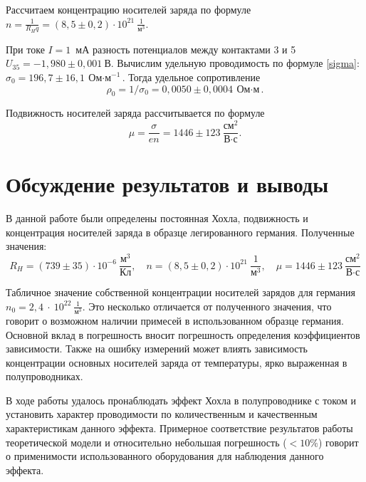 \documentclass[a4paper,12pt]{article} %
\begin{document}
Рассчитаем концентрацию носителей заряда по формуле $n = \frac{1}{R_H q} = (8,5\pm0,2) \cdot 10^{21}~\frac{1}{\text{м}^3}$.

При токе $I = 1$~мА разность потенциалов между контактами 3 и 5 \newline $U_{35} = -1,980\pm0,001~\text{В}$. Вычислим удельную проводимость по формуле \eqref{sigma}: \newline $\sigma_0 = 196,7\pm16,1~{\text{Ом} \cdot \text{м}}^{-1}$. Тогда удельное сопротивление $$\rho_0 = 1/\sigma_0 = 0,0050\pm0,0004~{\text{Ом} \cdot \text{м}}.$$

Подвижность носителей заряда рассчитывается по формуле $$\mu = \frac{\sigma}{e n} = 1446\pm123~\frac{\text{см}^2}{\text{В} \cdot \text{с}}.$$

\section{Обсуждение результатов и выводы}

В данной работе были определены постоянная Хохла, подвижность и концентрация носителей заряда в образце легированного германия. Полученные значения:
$$\boxed{R_H = (739\pm35) \cdot 10^{-6}~\frac{\text{м}^3}{\text{Кл}}, \quad n = (8,5\pm0,2) \cdot 10^{21}~\frac{1}{\text{м}^3}, \quad \mu = 1446\pm123~\frac{\text{см}^2}{\text{В} \cdot \text{с}}}$$

Табличное значение собственной концентрации носителей зарядов для германия $n_0 = 2,4~\cdot~10^{22}~\frac{1}{\text{м}^3}$. Это несколько отличается от полученного значения, что говорит о возможном наличии примесей в использованном образце германия. Основной вклад в погрешность вносит погрешность определения коэффициентов зависимости. Также на ошибку измерений может влиять зависимость концентрации основных носителей заряда от температуры, ярко выраженная в полупроводниках.

В ходе работы удалось пронаблюдать эффект Хохла в полупроводнике с током и установить характер проводимости по количественным и качественным характеристикам данного эффекта. Примерное соответствие результатов работы теоретической модели и относительно небольшая погрешность ($<10\%$) говорит о применимости использованного оборудования для наблюдения данного эффекта.
\end{document}

